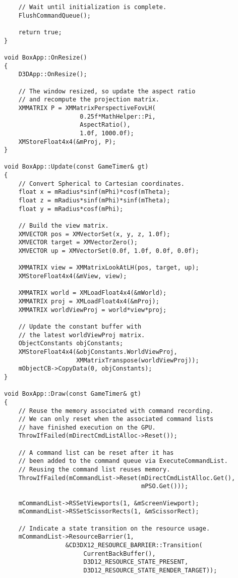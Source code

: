 \begin{lstlisting}
    // Wait until initialization is complete.
    FlushCommandQueue();

    return true;
}

void BoxApp::OnResize()
{
    D3DApp::OnResize();

    // The window resized, so update the aspect ratio 
    // and recompute the projection matrix.
    XMMATRIX P = XMMatrixPerspectiveFovLH(
                     0.25f*MathHelper::Pi, 
                     AspectRatio(), 
                     1.0f, 1000.0f);
    XMStoreFloat4x4(&mProj, P);
}

void BoxApp::Update(const GameTimer& gt)
{
    // Convert Spherical to Cartesian coordinates.
    float x = mRadius*sinf(mPhi)*cosf(mTheta);
    float z = mRadius*sinf(mPhi)*sinf(mTheta);
    float y = mRadius*cosf(mPhi);

    // Build the view matrix.
    XMVECTOR pos = XMVectorSet(x, y, z, 1.0f);
    XMVECTOR target = XMVectorZero();
    XMVECTOR up = XMVectorSet(0.0f, 1.0f, 0.0f, 0.0f);

    XMMATRIX view = XMMatrixLookAtLH(pos, target, up);
    XMStoreFloat4x4(&mView, view);

    XMMATRIX world = XMLoadFloat4x4(&mWorld);
    XMMATRIX proj = XMLoadFloat4x4(&mProj);
    XMMATRIX worldViewProj = world*view*proj;

    // Update the constant buffer with 
    // the latest worldViewProj matrix.
    ObjectConstants objConstants;
    XMStoreFloat4x4(&objConstants.WorldViewProj, 
                    XMMatrixTranspose(worldViewProj));
    mObjectCB->CopyData(0, objConstants);
}

void BoxApp::Draw(const GameTimer& gt)
{
    // Reuse the memory associated with command recording.
    // We can only reset when the associated command lists 
    // have finished execution on the GPU.
    ThrowIfFailed(mDirectCmdListAlloc->Reset());

    // A command list can be reset after it has 
    // been added to the command queue via ExecuteCommandList.
    // Reusing the command list reuses memory.
    ThrowIfFailed(mCommandList->Reset(mDirectCmdListAlloc.Get(), 
                                      mPSO.Get()));

    mCommandList->RSSetViewports(1, &mScreenViewport);
    mCommandList->RSSetScissorRects(1, &mScissorRect);

    // Indicate a state transition on the resource usage.
    mCommandList->ResourceBarrier(1, 
                 &CD3DX12_RESOURCE_BARRIER::Transition(
                      CurrentBackBuffer(),
                      D3D12_RESOURCE_STATE_PRESENT, 
                      D3D12_RESOURCE_STATE_RENDER_TARGET));


\end{lstlisting}
